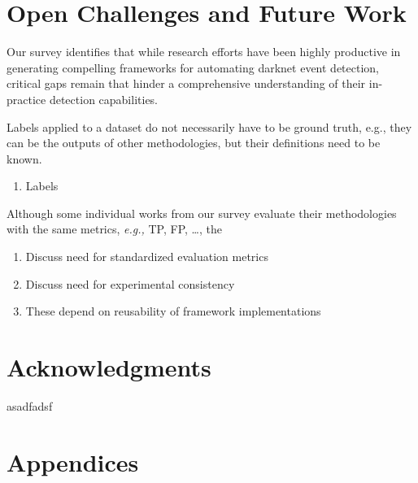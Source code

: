 \documentclass[manuscript,nonacm]{acmart}
\begin{document}
\label{sec:fw}
\section{Open Challenges and Future Work}

Our survey identifies that while research efforts have been highly productive in generating compelling frameworks for automating darknet event detection, 
critical gaps remain that hinder a comprehensive understanding of their in-practice detection capabilities.


Labels applied to a dataset do not necessarily have to be ground truth, e.g., they can be the outputs of other methodologies, but their definitions 
need to be known. 

\begin{enumerate}
	\item Labels
\end{enumerate}


Although some individual works from our survey evaluate their methodologies with the same metrics, \textit{e.g.,} TP, FP, \dots, 
the

\begin{enumerate}
	\item Discuss need for standardized evaluation metrics
	\item Discuss need for experimental consistency
	\item These depend on reusability of framework implementations
\end{enumerate}

\section{Acknowledgments}
asadfadsf

\section{Appendices}
\end{document}
